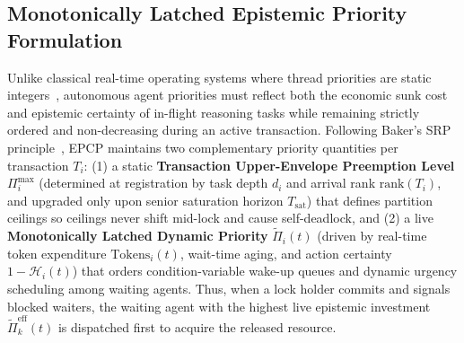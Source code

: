 \documentclass[conference,10pt]{IEEEtran}
\begin{document}
\subsection{Monotonically Latched Epistemic Priority Formulation}
Unlike classical real-time operating systems where thread priorities are static integers~\cite{sha1990priority, baker1991stack}, autonomous agent priorities must reflect both the economic sunk cost and epistemic certainty of in-flight reasoning tasks while remaining strictly ordered and non-decreasing during an active transaction. Following Baker's SRP principle~\cite{baker1991stack}, EPCP maintains two complementary priority quantities per transaction $T_i$: (1) a static \textbf{Transaction Upper-Envelope Preemption Level} $\Pi_i^{\max}$ (determined at registration by task depth $d_i$ and arrival rank $\text{rank}(T_i)$, and upgraded only upon senior saturation horizon $T_{\text{sat}}$) that defines partition ceilings so ceilings never shift mid-lock and cause self-deadlock, and (2) a live \textbf{Monotonically Latched Dynamic Priority} $\tilde{\Pi}_i(t)$ (driven by real-time token expenditure $\text{Tokens}_i(t)$, wait-time aging, and action certainty $1 - \mathcal{H}_i(t)$) that orders condition-variable wake-up queues and dynamic urgency scheduling among waiting agents. Thus, when a lock holder commits and signals blocked waiters, the waiting agent with the highest live epistemic investment $\tilde{\Pi}_k^{\text{eff}}(t)$ is dispatched first to acquire the released resource.
\end{document}
